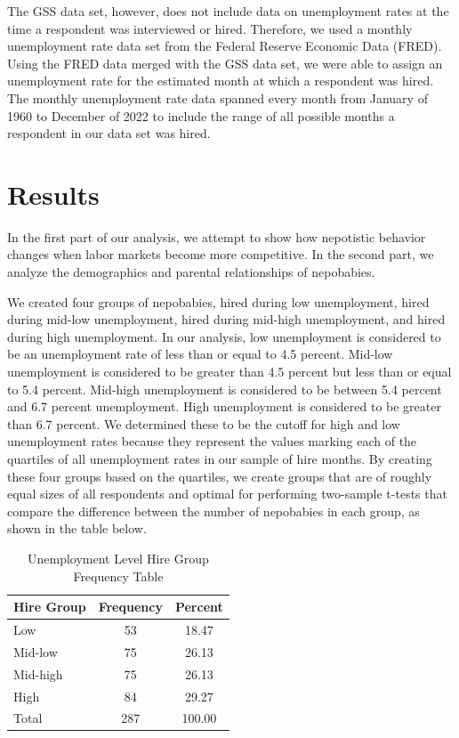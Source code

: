 \documentclass[12pt]{article}
\begin{document}
The GSS data set, however, does not include data on unemployment rates at the time a respondent was interviewed or hired. Therefore, we used a monthly unemployment rate data set from the Federal Reserve Economic Data (FRED). Using the FRED data merged with the GSS data set, we were able to assign an unemployment rate for the estimated month at which a respondent was hired. The monthly unemployment rate data spanned every month from January of 1960 to December of 2022 to include the range of all possible months a respondent in our data set was hired. 


\section{Results}
\label{sec:result}

In the first part of our analysis, we attempt to show how nepotistic behavior changes when labor markets become more competitive. In the second part, we analyze the demographics and parental relationships of nepobabies.


We created four groups of nepobabies, hired during low unemployment, hired during mid-low unemployment, hired during mid-high unemployment, and hired during high unemployment. In our analysis, low unemployment is considered to be an unemployment rate of less than or equal to 4.5 percent. Mid-low unemployment is considered to be greater than 4.5 percent but less than or equal to 5.4 percent. Mid-high unemployment is considered to be between 5.4 percent and 6.7 percent unemployment. High unemployment is considered to be greater than 6.7 percent. We determined these to be the cutoff for high and low unemployment rates because they represent the values marking each of the quartiles of all unemployment rates in our sample of hire months. By creating these four groups based on the quartiles, we create groups that are of roughly equal sizes of all respondents and optimal for performing two-sample t-tests that compare the difference between the number of nepobabies in each group, as shown in the table below.

\begin{table}[ht]
\centering
\begin{tabular}{l|cc}
Hire Group & Frequency & Percent \\
\hline 
Low & 53 & 18.47 \\
Mid-low & 75 & 26.13 \\
Mid-high & 75 & 26.13 \\
High & 84 & 29.27 \\
\hline 
Total & 287 & 100.00
\end{tabular}
\caption{Unemployment Level Hire Group Frequency Table}
\label{tab:mytable}
\end{table}
\end{document}
